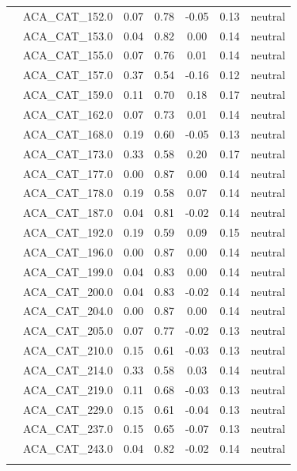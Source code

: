 \documentclass[11pt,]{article}
\begin{document}
\begin{longtable}[c]{@{}lcccccc@{}}
\\\addlinespace
& ACA\_CAT\_152.0 & 0.07 & 0.78 & -0.05 & 0.13 & neutral
\\\addlinespace
& ACA\_CAT\_153.0 & 0.04 & 0.82 & 0.00 & 0.14 & neutral
\\\addlinespace
& ACA\_CAT\_155.0 & 0.07 & 0.76 & 0.01 & 0.14 & neutral
\\\addlinespace
& ACA\_CAT\_157.0 & 0.37 & 0.54 & -0.16 & 0.12 & neutral
\\\addlinespace
& ACA\_CAT\_159.0 & 0.11 & 0.70 & 0.18 & 0.17 & neutral
\\\addlinespace
& ACA\_CAT\_162.0 & 0.07 & 0.73 & 0.01 & 0.14 & neutral
\\\addlinespace
& ACA\_CAT\_168.0 & 0.19 & 0.60 & -0.05 & 0.13 & neutral
\\\addlinespace
& ACA\_CAT\_173.0 & 0.33 & 0.58 & 0.20 & 0.17 & neutral
\\\addlinespace
& ACA\_CAT\_177.0 & 0.00 & 0.87 & 0.00 & 0.14 & neutral
\\\addlinespace
& ACA\_CAT\_178.0 & 0.19 & 0.58 & 0.07 & 0.14 & neutral
\\\addlinespace
& ACA\_CAT\_187.0 & 0.04 & 0.81 & -0.02 & 0.14 & neutral
\\\addlinespace
& ACA\_CAT\_192.0 & 0.19 & 0.59 & 0.09 & 0.15 & neutral
\\\addlinespace
& ACA\_CAT\_196.0 & 0.00 & 0.87 & 0.00 & 0.14 & neutral
\\\addlinespace
& ACA\_CAT\_199.0 & 0.04 & 0.83 & 0.00 & 0.14 & neutral
\\\addlinespace
& ACA\_CAT\_200.0 & 0.04 & 0.83 & -0.02 & 0.14 & neutral
\\\addlinespace
& ACA\_CAT\_204.0 & 0.00 & 0.87 & 0.00 & 0.14 & neutral
\\\addlinespace
& ACA\_CAT\_205.0 & 0.07 & 0.77 & -0.02 & 0.13 & neutral
\\\addlinespace
& ACA\_CAT\_210.0 & 0.15 & 0.61 & -0.03 & 0.13 & neutral
\\\addlinespace
& ACA\_CAT\_214.0 & 0.33 & 0.58 & 0.03 & 0.14 & neutral
\\\addlinespace
& ACA\_CAT\_219.0 & 0.11 & 0.68 & -0.03 & 0.13 & neutral
\\\addlinespace
& ACA\_CAT\_229.0 & 0.15 & 0.61 & -0.04 & 0.13 & neutral
\\\addlinespace
& ACA\_CAT\_237.0 & 0.15 & 0.65 & -0.07 & 0.13 & neutral
\\\addlinespace
& ACA\_CAT\_243.0 & 0.04 & 0.82 & -0.02 & 0.14 & neutral
\\\addlinespace

\end{longtable}
\end{document}
